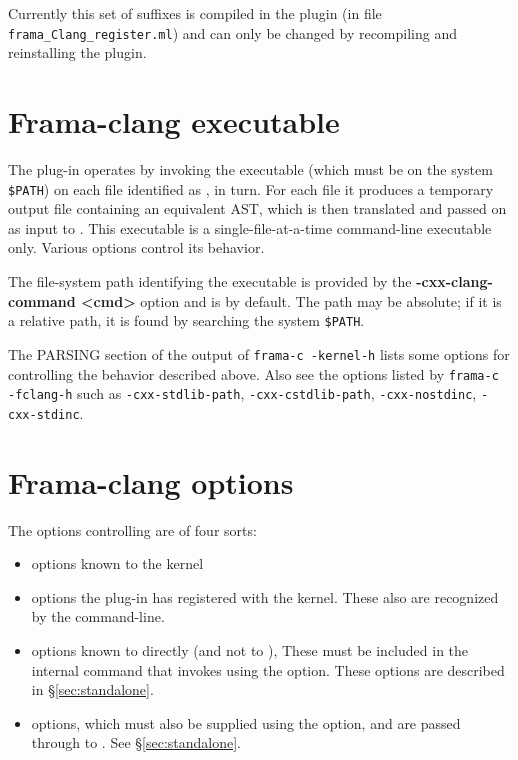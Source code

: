 Currently this set of suffixes is compiled in the plugin (in file \texttt{frama\_Clang\_register.ml}) and can only be changed by recompiling and
reinstalling the plugin.

\section{Frama-clang executable}
The plug-in operates by invoking the executable \irg (which must be on the system \verb|$PATH|)
on each file identified as \cpp, in turn. 
For each file it produces a temporary output file containing an equivalent \C AST, which is then translated and passed on as input to \framac. 
This executable is a single-file-at-a-time command-line executable only. 
Various options control its behavior.

The file-system path identifying the executable is provided by the \textbf{-cxx-clang-command <cmd>}
option and is \irg by default. The path may be absolute; if it is a relative path, it is found by searching the system \verb|$PATH|.


The PARSING section of the output of \lstinline|frama-c -kernel-h| lists some options for controlling the behavior described above. Also see the options listed by \lstinline|frama-c -fclang-h| such as \lstinline|-cxx-stdlib-path|, \lstinline|-cxx-cstdlib-path|, \lstinline|-cxx-nostdinc|, \lstinline|-cxx-stdinc|.

\section{Frama-clang options}

The options controlling \fclang are of four sorts:
\begin{itemize}
\item options known to the \framac kernel 
\item options the  \fclang plug-in has registered with the \framac kernel. These also are recognized by the \fc command-line.
\item options known to \irg directly (and not to \fc), These must be 
included in the internal command that invokes \irg using the  option. These options are described in \S\ref{sec:standalone}.
\item \clang options, which must also be supplied using the  option, and are passed through \irg to \cl. See \S\ref{sec:standalone}.
\end{itemize}

